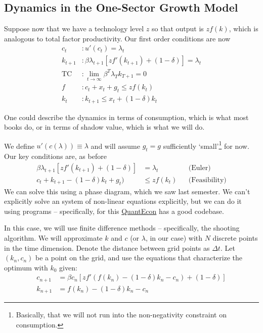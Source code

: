\documentclass[10pt]{article}
\begin{document}
\subsection{Dynamics in the One-Sector Growth Model}


Suppose now that we have a technology level $z$ so that output is $zf(k)$, which is analogous to total factor productivity. Our first order conditions are now
\begin{align*}
	c_t &: u'(c_t) = \lambda_t \\ k_{t+1} &: \beta \lambda_{t+1} [zf'(k_{t+1}) + (1-\delta)] = \lambda_t \\ \text{TC} &: \lim_{t\to\infty} \beta^T \lambda_T k_{T+1} = 0 \\ f&: c_t + x_t + g_t \le zf(k_t) \\ k_t &: k_{t+1} \le x_t + (1-\delta)k_t
\end{align*}
\begin{remark}
One could describe the dynamics in terms of consumption, which is what most books do, or in terms of shadow value, which is what we will do.
\end{remark}
We define $u'(c(\lambda)) \equiv \lambda$ and will assume $g_t = g$ sufficiently `small'\footnote{Basically, that we will not run into the non-negativity constraint on consumption.} for now. Our key conditions are, as before
\begin{align*}
	\beta \lambda_{t+1}[zf'(k_{t+1}) + (1-\delta)] &= \lambda_t &&\text{(Euler)} \\
	c_t + k_{t+1} - (1-\delta) k_t + g_t) &\le zf(k_t) &&\text{(Feasibility)}
\end{align*}
We can solve this using a phase diagram, which we saw last semester. We can't explicitly solve an  system of non-linear equations explicitly, but we can do it using programs -- specifically, for this \href{https://python.quantecon.org/cass_koopmans_1.html}{QuantEcon} has a good codebase.

In this case, we will use finite difference methods -- specifically, the shooting algorithm. We will approximate $k$ and $c$ (or $\lambda$, in our case) with $N$ discrete points in the time dimension. Denote the distance between grid points as $\Delta t$. Let $(k_n,c_n)$ be a point on the grid, and use the equations that characterize the optimum with $k_0$ given:
\begin{align*}
	c_{n+1} &= \beta c_n [zf'(f(k_n) - (1-\delta)k_n - c_n) + (1-\delta)] \\ k_{n+1} &= f(k_n) - (1-\delta)k_n - c_n
\end{align*}
\end{document}
